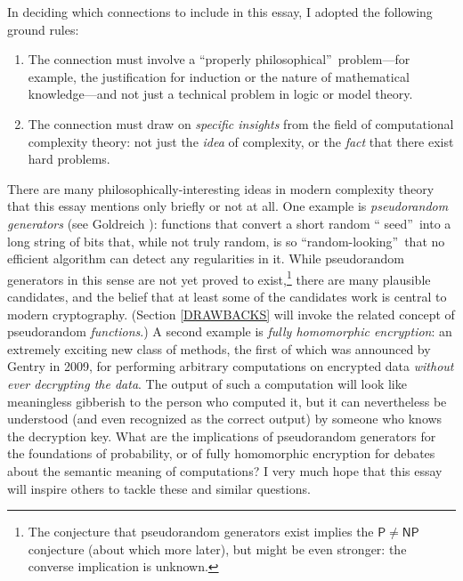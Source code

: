 \documentclass[12pt,onecolumn]{article}%
\begin{document}
In deciding which connections to include in this essay, I adopted the
following ground rules:

\begin{enumerate}
\item[(1)] The connection must involve a \textquotedblleft properly
philosophical\textquotedblright\  problem---for example, the justification for
induction or the nature of mathematical knowledge---and not just a technical
problem in logic or model theory.

\item[(2)] The connection must draw on \textit{specific insights} from the
field of computational complexity theory: not just the \textit{idea} of
complexity, or the \textit{fact} that there exist hard problems.
\end{enumerate}

There are many philosophically-interesting ideas in modern complexity theory
that this essay mentions only briefly or not at all. One example is
\textit{pseudorandom generators} (see Goldreich \cite{goldreich:prg}%
): functions that convert a short random \textquotedblleft
seed\textquotedblright\  into a long string of bits that, while not truly
random, is so \textquotedblleft random-looking\textquotedblright\  that no
efficient algorithm can detect any regularities in it. While pseudorandom
generators in this sense are not yet proved to exist,\footnote{The conjecture
that pseudorandom generators exist implies the $\mathsf{P}\neq\mathsf{NP}%
$ conjecture (about which more later), but might be even stronger: the
converse implication is unknown.} there are many plausible candidates, and the
belief that at least some of the candidates work is central to modern
cryptography. (Section \ref{DRAWBACKS} will invoke the related concept of
pseudorandom \textit{functions}.) A second example is \textit{fully
homomorphic encryption}: an extremely exciting new class of methods, the first
of which was announced by Gentry \cite{gentry} in 2009, for performing
arbitrary computations on encrypted data \textit{without ever decrypting the
data}. The output of such a computation will look like meaningless gibberish
to the person who computed it, but it can nevertheless be understood (and even
recognized as the correct output) by someone who knows the decryption key.
 What are the implications of pseudorandom generators for the foundations of
probability, or of fully homomorphic encryption for debates about the semantic
meaning of computations? I very much hope that this essay will inspire
others to tackle these and similar questions.
\end{document}
